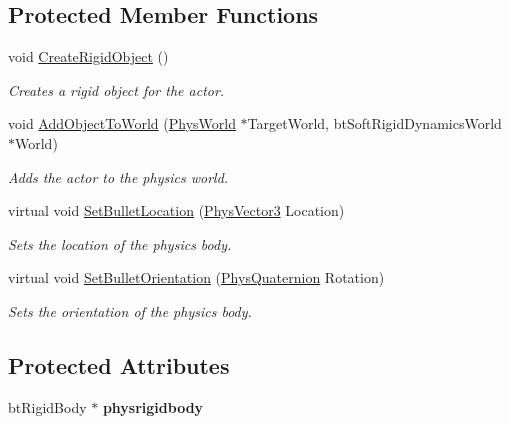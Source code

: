 \subsection*{Protected Member Functions}
\begin{DoxyCompactItemize}
\item 
void \hyperlink{classActorSta_ae856b69de748541606649d21d2e6c270}{CreateRigidObject} ()
\begin{DoxyCompactList}\small\item\em Creates a rigid object for the actor. \item\end{DoxyCompactList}\item 
void \hyperlink{classActorSta_acd11f1ee404ab71d49d8fd4a810f2931}{AddObjectToWorld} (\hyperlink{classPhysWorld}{PhysWorld} $\ast$TargetWorld, btSoftRigidDynamicsWorld $\ast$World)
\begin{DoxyCompactList}\small\item\em Adds the actor to the physics world. \item\end{DoxyCompactList}\item 
virtual void \hyperlink{classActorSta_a472768e39d3ac67f35b9f74e5a679b99}{SetBulletLocation} (\hyperlink{classPhysVector3}{PhysVector3} Location)
\begin{DoxyCompactList}\small\item\em Sets the location of the physics body. \item\end{DoxyCompactList}\item 
virtual void \hyperlink{classActorSta_ab038b2ce4e25fa3441e9b081cef7879e}{SetBulletOrientation} (\hyperlink{classPhysQuaternion}{PhysQuaternion} Rotation)
\begin{DoxyCompactList}\small\item\em Sets the orientation of the physics body. \item\end{DoxyCompactList}\end{DoxyCompactItemize}
\subsection*{Protected Attributes}
\begin{DoxyCompactItemize}
\item 
\hypertarget{classActorSta_ad12363fc4cd60d6cdd5e3c6d36d96f20}{
btRigidBody $\ast$ {\bfseries physrigidbody}}
\label{d3/daf/classActorSta_ad12363fc4cd60d6cdd5e3c6d36d96f20}

\end{DoxyCompactItemize}


